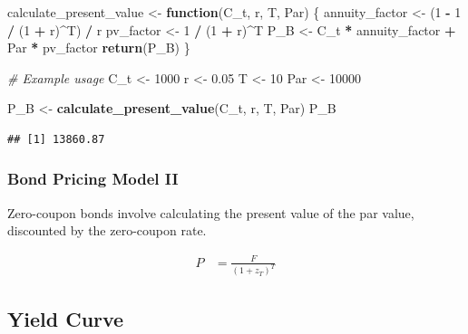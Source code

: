 \documentclass[
]{book}
\newenvironment{Shaded}{\begin{snugshade}}{\end{snugshade}}
\newcommand{\CommentTok}[1]{\textcolor[rgb]{0.56,0.35,0.01}{\textit{#1}}}
\newcommand{\ControlFlowTok}[1]{\textcolor[rgb]{0.13,0.29,0.53}{\textbf{#1}}}
\newcommand{\DecValTok}[1]{\textcolor[rgb]{0.00,0.00,0.81}{#1}}
\newcommand{\FloatTok}[1]{\textcolor[rgb]{0.00,0.00,0.81}{#1}}
\newcommand{\FunctionTok}[1]{\textcolor[rgb]{0.13,0.29,0.53}{\textbf{#1}}}
\newcommand{\NormalTok}[1]{#1}
\newcommand{\OtherTok}[1]{\textcolor[rgb]{0.56,0.35,0.01}{#1}}
\newcommand{\SpecialCharTok}[1]{\textcolor[rgb]{0.81,0.36,0.00}{\textbf{#1}}}
\begin{document}
\begin{Shaded}
\begin{Highlighting}[]
\NormalTok{calculate\_present\_value }\OtherTok{\textless{}{-}} \ControlFlowTok{function}\NormalTok{(C\_t, r, T, Par) \{}
\NormalTok{  annuity\_factor }\OtherTok{\textless{}{-}}\NormalTok{ (}\DecValTok{1} \SpecialCharTok{{-}} \DecValTok{1} \SpecialCharTok{/}\NormalTok{ (}\DecValTok{1} \SpecialCharTok{+}\NormalTok{ r)}\SpecialCharTok{\^{}}\NormalTok{T) }\SpecialCharTok{/}\NormalTok{ r}
\NormalTok{  pv\_factor }\OtherTok{\textless{}{-}} \DecValTok{1} \SpecialCharTok{/}\NormalTok{ (}\DecValTok{1} \SpecialCharTok{+}\NormalTok{ r)}\SpecialCharTok{\^{}}\NormalTok{T}
\NormalTok{  P\_B }\OtherTok{\textless{}{-}}\NormalTok{ C\_t }\SpecialCharTok{*}\NormalTok{ annuity\_factor }\SpecialCharTok{+}\NormalTok{ Par }\SpecialCharTok{*}\NormalTok{ pv\_factor}
  \FunctionTok{return}\NormalTok{(P\_B)}
\NormalTok{\}}

\CommentTok{\# Example usage}
\NormalTok{C\_t }\OtherTok{\textless{}{-}} \DecValTok{1000}
\NormalTok{r }\OtherTok{\textless{}{-}} \FloatTok{0.05}
\NormalTok{T }\OtherTok{\textless{}{-}} \DecValTok{10}
\NormalTok{Par }\OtherTok{\textless{}{-}} \DecValTok{10000}

\NormalTok{P\_B }\OtherTok{\textless{}{-}} \FunctionTok{calculate\_present\_value}\NormalTok{(C\_t, r, T, Par)}
\NormalTok{P\_B}
\end{Highlighting}
\end{Shaded}

\begin{verbatim}
## [1] 13860.87
\end{verbatim}

\hypertarget{bond-pricing-model-ii}{%
\subsubsection{Bond Pricing Model II}\label{bond-pricing-model-ii}}

Zero-coupon bonds involve calculating the present value of the par value, discounted by the zero-coupon rate.

\[
\begin{align}
P &= \frac{F}{(1 + z_T)^T}
\end{align}
\]

\hypertarget{yield-curve}{%
\subsection{Yield Curve}\label{yield-curve}}
\end{document}

